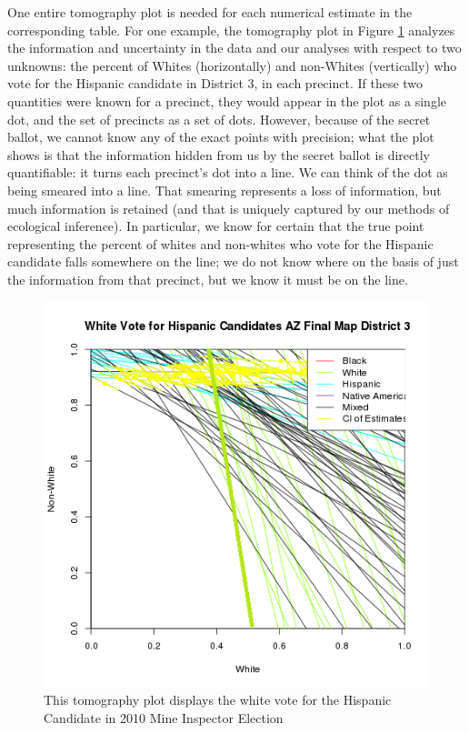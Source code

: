 \documentclass[12pt]{article}
\begin{document}
One entire tomography plot is needed for each numerical estimate in
the corresponding table. For one example, the tomography plot in
Figure \ref{tomog} analyzes the information and uncertainty in the
data and our analyses with respect to two unknowns: the percent of
Whites (horizontally) and non-Whites (vertically) who vote for the
Hispanic candidate in District 3, in each precinct.  If these two
quantities were known for a precinct, they would appear in the plot as
a single dot, and the set of precincts as a set of dots.  However,
because of the secret ballot, we cannot know any of the exact points
with precision; what the plot shows is that the information hidden
from us by the secret ballot is directly quantifiable: it turns each
precinct's dot into a line.  We can think of the dot as being smeared
into a line. That smearing represents a loss of information, but much
information is retained (and that is uniquely captured by our methods
of ecological inference).  In particular, we know for certain that the
true point representing the percent of whites and non-whites who vote
for the Hispanic candidate falls somewhere on the line; we do not know
where on the basis of just the information from that precinct, but we
know it must be on the line.

\begin{figure}[htb]
\begin{center}
\includegraphics[scale=1]{figs/pl_whitevote_h_3_ld.png}
\caption{\label{tomog}This tomography plot displays the white vote for the Hispanic
  Candidate in 2010 Mine Inspector Election}
\end{center}
\end{figure}
\end{document}
